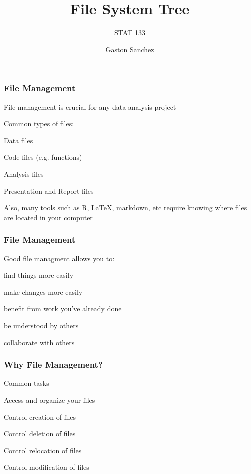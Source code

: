 \documentclass[12pt]{beamer}\usepackage[]{graphicx}\usepackage[]{color}
\title{File System Tree}
\subtitle{STAT 133}
\author{\href{http://www.gastonsanchez.com}{Gaston Sanchez}}
\institute{\href{https://github.com/ucb-stat133/stat133-fall-2016}{\tt \scriptsize \color{foreground} github.com/ucb-stat133/stat133-fall-2016}}
\date{}
\begin{document}
{
  \frame{
    \titlepage
  } 
}


\begin{frame}
\begin{center}
\Huge{}
\end{center}
\end{frame}


\begin{frame}
\frametitle{File Management}

File management is crucial for any data analysis project

Common types of files:
\bi
  \item Data files
  \item Code files (e.g. functions)
  \item Analysis files
  \item Presentation and Report files
\ei

Also, many tools such as R, LaTeX, markdown, etc require knowing where files are located in your computer
\end{frame}


\begin{frame}
\frametitle{File Management}

Good file managment allows you to:
\bi
  \item find things more easily
  \item make changes more easily
  \item benefit from work you've already done
  \item be understood by others
  \item collaborate with others
\ei

\end{frame}


\begin{frame}
\frametitle{Why File Management?}

Common tasks
\bi
  \item Access and organize your files
  \item Control creation of files
  \item Control deletion of files
  \item Control relocation of files
  \item Control modification of files
\ei

\end{frame}
\end{document}
